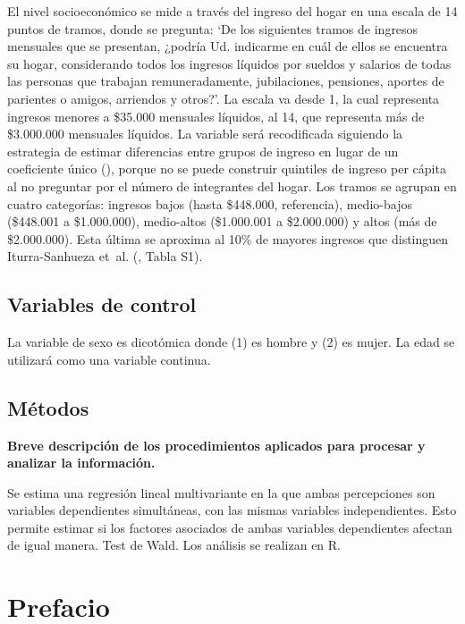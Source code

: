 \documentclass[
  spanish,
  a4paper,
  oneside]{scrbook}
\begin{document}
El nivel socioeconómico se mide a través del ingreso del hogar en una
escala de 14 puntos de tramos, donde se pregunta: `De los siguientes
tramos de ingresos mensuales que se presentan, ¿podría Ud. indicarme en
cuál de ellos se encuentra su hogar, considerando todos los ingresos
líquidos por sueldos y salarios de todas las personas que trabajan
remuneradamente, jubilaciones, pensiones, aportes de parientes o amigos,
arriendos y otros?'. La escala va desde 1, la cual representa ingresos
menores a \$35.000 mensuales líquidos, al 14, que representa más de
\$3.000.000 mensuales líquidos. La variable será recodificada siguiendo
la estrategia de estimar diferencias entre grupos de ingreso en lugar de
un coeficiente único (), porque no se puede construir quintiles de ingreso
per cápita al no preguntar por el número de integrantes del hogar. Los
tramos se agrupan en cuatro categorías: ingresos bajos (hasta \$448.000,
referencia), medio-bajos (\$448.001 a \$1.000.000), medio-altos
(\$1.000.001 a \$2.000.000) y altos (más de \$2.000.000). Esta última se
aproxima al 10\% de mayores ingresos que distinguen Iturra-Sanhueza
et~al. (, Tabla S1).

\section{Variables de control}\label{variables-de-control-1}

La variable de sexo es dicotómica donde (1) es hombre y (2) es mujer. La
edad se utilizará como una variable continua.

\section{Métodos}\label{muxe9todos}

\textbf{Breve descripción de los procedimientos aplicados para procesar
y analizar la información.}

Se estima una regresión lineal multivariante en la que ambas
percepciones son variables dependientes simultáneas, con las mismas
variables independientes. Esto permite estimar si los factores asociados
de ambas variables dependientes afectan de igual manera. Test de Wald.
Los análisis se realizan en R.


\chapter*{Prefacio}\label{prefacio}
\end{document}
